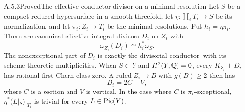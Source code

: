 
\begin{statement}{A.5.3}{Proved}{The effective conductor divisor on a minimal resolution}
Let $S$ be a compact reduced hypersurface in a smooth threefold, let $\eta:\coprod_i T_i\to S$ be its normalization, and let $\pi_i:Z_i\to T_i$ be the minimal resolutions. Put $h_i=\eta\pi_i$. There are canonical effective integral divisors $D_i$ on $Z_i$ with
\[
 \omega_{Z_i}(D_i)\simeq h_i^*\omega_S.
 \tag{A.25}
\]
The nonexceptional part of $D_i$ is exactly the divisorial conductor, with its scheme-theoretic multiplicities. When $S\subset Y$ and $H^2(Y,\mathbb Q)=0$, every $K_{Z_i}+D_i$ has rational first Chern class zero. A ruled $Z_i\to B$ with $g(B)\ge2$ then has
\[
 D_i=2C+V,
 \tag{A.26}
\]
where $C$ is a section and $V$ is vertical. In the case where $C$ is $\pi_i$-exceptional, $\eta^*(L|_S)|_{T_i}$ is trivial for every $L\in\operatorname{Pic}(Y)$.
\end{statement}
